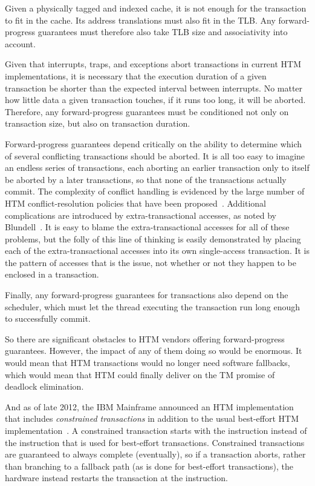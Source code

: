 Given a physically tagged and indexed cache, it is not enough for the
transaction to fit in the cache.
Its address translations must also fit in the TLB.
Any forward-progress guarantees must therefore also take TLB size
and associativity into account.

Given that interrupts, traps, and exceptions abort transactions in current
HTM implementations, it is necessary that the execution duration of
a given transaction be shorter than the expected interval between
interrupts.
No matter how little data a given transaction touches, if it runs too
long, it will be aborted.
Therefore, any forward-progress guarantees must be conditioned not only
on transaction size, but also on transaction duration.

Forward-progress guarantees depend critically on the ability to determine
which of several conflicting transactions should be aborted.
It is all too easy to imagine an endless series of transactions, each
aborting an earlier transaction only to itself be aborted by a later
transactions, so that none of the transactions actually commit.
The complexity of conflict handling is
evidenced by the large number of HTM conflict-resolution policies
that have been proposed~\cite{EgeAkpinar2011HTM2TLE,YujieLiu2011ToxicTransactions}.
Additional complications are introduced by extra-transactional accesses,
as noted by Blundell~\cite{Blundell2006TMdeadlock}.
It is easy to blame the extra-transactional accesses for all of these
problems, but the folly of this line of thinking is easily demonstrated
by placing each of the extra-transactional accesses into its own
single-access transaction.
It is the pattern of accesses that is the issue, not whether or not they
happen to be enclosed in a transaction.

Finally, any forward-progress guarantees for transactions also
depend on the scheduler, which must let the thread executing the
transaction run long enough to successfully commit.

So there are significant obstacles to HTM vendors offering forward-progress
guarantees.
However, the impact of any of them doing so would be enormous.
It would mean that HTM transactions would no longer need software
fallbacks, which would mean that HTM could finally deliver on the
TM promise of deadlock elimination.

And as of late 2012, the IBM Mainframe announced an HTM
implementation that includes \emph{constrained transactions}
in addition to the usual best-effort HTM
implementation~\cite{ChristianJacobi2012MainframeTM}.
A constrained transaction starts with the  instruction
instead of the  instruction that is used for best-effort
transactions.
Constrained transactions are guaranteed to always complete (eventually),
so if a transaction aborts, rather than branching to a fallback path
(as is done for best-effort transactions), the hardware instead restarts
the transaction at the  instruction.

